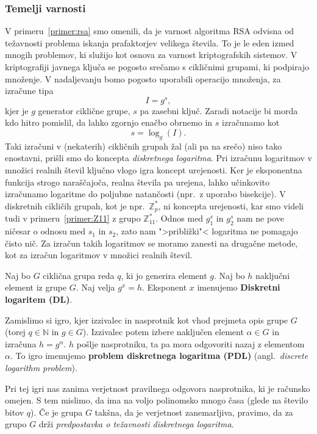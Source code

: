 \documentclass[isrm2, tisk]{fmfdelo}
\newcommand{\N}{\mathbb N}
\newcommand{\Z}{\mathbb Z}
\begin{document}
\subsubsection{Temelji varnosti}
V primeru~\ref{primer:rsa} smo omenili, da je varnost algoritma RSA odvisna od težavnosti problema
iskanja prafaktorjev velikega števila. To je le eden izmed mnogih problemov, ki služijo kot osnova
za varnost kriptografskih sistemov. V kriptografiji javnega ključa se pogosto srečamo s cikličnimi
grupami, ki podpirajo množenje. V nadaljevanju bomo pogosto uporabili operacijo množenja, za izračune
tipa 
$$
I = g^s,
$$
kjer je $g$ generator ciklične grupe, $s$ pa zasebni ključ. Zaradi notacije bi morda kdo hitro pomislil,
da lahko zgornjo enačbo obrnemo in $s$ izračunamo kot 
$$ 
s = \log_g(I).
$$
Taki izračuni v (nekaterih) cikličnih grupah žal (ali pa na srečo) niso tako enostavni, prišli smo do
koncepta \textit{diskretnega logaritma}. Pri izračunu logaritmov v množici realnih števil ključno
vlogo igra koncept urejenosti. Ker je eksponentna funkcija strogo naraščajoča, realna števila pa urejena,
lahko učinkovito izračunamo logaritme do poljubne natančosti (npr.\ z uporabo bisekcije). V diskretnih
cikličih grupah, kot je npr.\ $\Z_p^*$, ni koncepta urejenosti, kar smo videli tudi v
primeru~\ref{primer:Z11} z grupo $\Z_{11}^*$. Odnos med $g^s_1$ in $g^s_2$ nam ne pove ničesar o
odnosu med $s_1$ in $s_2$, zato nam ">približki"< logaritma ne pomagajo čisto nič. Za izračun takih
logaritmov se moramo zanesti na drugačne metode, kot za izračun logaritmov v množici realnih števil.

\begin{definicija}
\label{def:dl}
    Naj bo $G$ ciklična grupa reda $q$, ki jo generira element $g$. Naj bo $h$ naključni element iz 
    grupe $G$. Naj velja $g^x = h$. Eksponent $x$ imenujemo \textbf{Diskretni logaritem (DL)}.

    Zamislimo si igro, kjer izzivalec in nasprotnik kot vhod prejmeta opis grupe $G$ (torej $q \in \N$
    in $g \in G$). Izzivalec potem izbere naključen element $\alpha \in G$ in izračuna $h = g^{\alpha}$.
    $h$ pošlje nasprotniku, ta pa mora odgovoriti nazaj z elementom $\alpha$. To igro imenujemo 
    \textbf{problem diskretnega logaritma (PDL)} (angl.\ \textit{discrete logarithm problem}).

    Pri tej igri nas zanima verjetnost pravilnega odgovora nasprotnika, ki je računsko omejen. S tem
    mislimo, da ima na voljo polinomsko mnogo časa (glede na število bitov $q$). Če je grupa $G$ takšna,
    da je verjetnost zanemarljiva, pravimo, da za grupo $G$ drži \textit{predpostavka o težavnosti
    diskretnega logaritma}.
\end{definicija}
\end{document}
